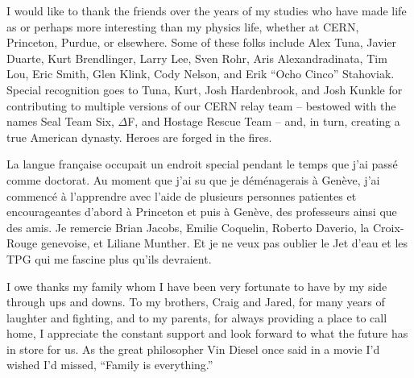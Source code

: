 I would like to thank the friends over the years of my studies
who have made life as or perhaps more interesting than my physics life,
whether at CERN, Princeton, Purdue, or elsewhere.
Some of these folks include Alex Tuna, Javier Duarte, Kurt Brendlinger, Larry Lee, Sven Rohr,
Aris Alexandradinata, Tim Lou, Eric Smith, Glen Klink, Cody Nelson, and Erik ``Ocho Cinco'' Stahoviak.
Special recognition goes to Tuna, Kurt, Josh Hardenbrook, and Josh Kunkle for contributing
to multiple versions of our CERN relay team -- bestowed with the names Seal Team Six, $\Delta$F,
and Hostage Rescue Team -- and, in turn, creating a true American dynasty.
Heroes are forged in the fires.

La langue française occupait un endroit special pendant le temps que j'ai passé comme doctorat.
Au moment que j'ai su que je déménagerais à Genève, j'ai commencé à l'apprendre avec l'aide de
plusieurs personnes patientes et encourageantes d'abord à Princeton et puis à Genève,
des professeurs ainsi que des amis.
Je remercie Brian Jacobs, Emilie Coquelin, Roberto Daverio, la Croix-Rouge genevoise,
et Liliane Munther. Et je ne veux pas oublier le Jet d'eau et les TPG qui me fascine
plus qu'ils devraient.

I owe thanks my family whom I have been very fortunate to have by my side through ups and
downs. To my brothers, Craig and Jared, for many years of laughter and fighting, and
to my parents, for always providing a place to call home, I appreciate the constant support
and look forward to what the future has in store for us.
As the great philosopher Vin Diesel once said in a movie I'd wished I'd missed,
``Family is everything.''

